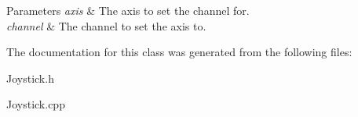 \begin{DoxyParams}{\-Parameters}
{\em axis} & \-The axis to set the channel for. \\
\hline
{\em channel} & \-The channel to set the axis to. \\
\hline
\end{DoxyParams}


\-The documentation for this class was generated from the following files\-:\begin{DoxyCompactItemize}
\item 
\-Joystick.\-h\item 
\-Joystick.\-cpp\end{DoxyCompactItemize}
